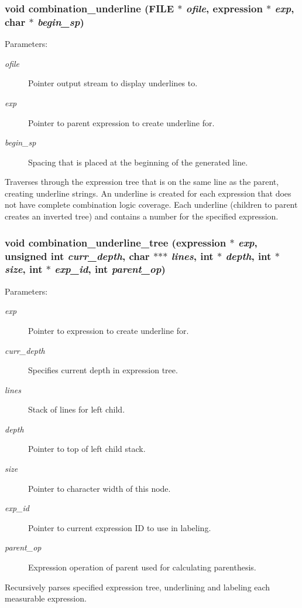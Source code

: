 \subsubsection{\setlength{\rightskip}{0pt plus 5cm}void combination\_\-underline (FILE $\ast$ {\em ofile}, {\bf expression} $\ast$ {\em exp}, char $\ast$ {\em begin\_\-sp})}\label{comb_8c_a12}


\begin{Desc}
\item[Parameters:]
\begin{description}
\item[{\em ofile}]Pointer output stream to display underlines to. \item[{\em exp}]Pointer to parent expression to create underline for. \item[{\em begin\_\-sp}]Spacing that is placed at the beginning of the generated line.\end{description}
\end{Desc}
Traverses through the expression tree that is on the same line as the parent, creating underline strings. An underline is created for each expression that does not have complete combination logic coverage. Each underline (children to parent creates an inverted tree) and contains a number for the specified expression. 
\subsubsection{\setlength{\rightskip}{0pt plus 5cm}void combination\_\-underline\_\-tree ({\bf expression} $\ast$ {\em exp}, unsigned int {\em curr\_\-depth}, char $\ast$$\ast$$\ast$ {\em lines}, int $\ast$ {\em depth}, int $\ast$ {\em size}, int $\ast$ {\em exp\_\-id}, int {\em parent\_\-op})}\label{comb_8c_a11}


\begin{Desc}
\item[Parameters:]
\begin{description}
\item[{\em exp}]Pointer to expression to create underline for. \item[{\em curr\_\-depth}]Specifies current depth in expression tree. \item[{\em lines}]Stack of lines for left child. \item[{\em depth}]Pointer to top of left child stack. \item[{\em size}]Pointer to character width of this node. \item[{\em exp\_\-id}]Pointer to current expression ID to use in labeling. \item[{\em parent\_\-op}]Expression operation of parent used for calculating parenthesis.\end{description}
\end{Desc}
Recursively parses specified expression tree, underlining and labeling each measurable expression. 


